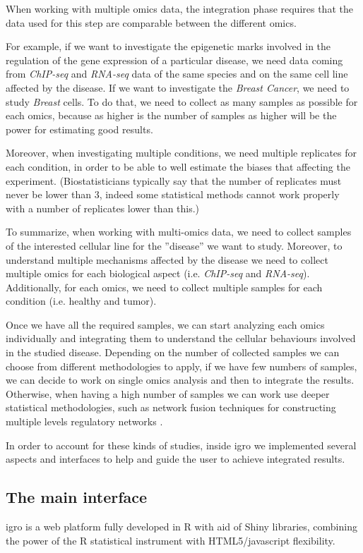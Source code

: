 When working with multiple omics data, the integration phase requires that the data used for this step are comparable between the different omics.

For example, if we want to investigate the epigenetic marks involved in the regulation of the gene expression of a particular disease, we need data coming from \textit{ChIP-seq} and \textit{RNA-seq} data of the same species and on the same cell line affected by the disease.
If we want to investigate the \textit{Breast Cancer}, we need to study \textit{Breast} cells.
To do that, we need to collect as many samples as possible for each omics, because as higher is the number of samples as higher will be the power for estimating good results.

Moreover, when investigating multiple conditions, we need multiple replicates for each condition, in order to be able to well estimate the biases that affecting the experiment.
(Biostatisticians typically say that the number of replicates must never be lower than 3, indeed some statistical methods cannot work properly with a number of replicates lower than this.)

To summarize, when working with multi-omics data, we need to collect samples of the interested cellular line for the ''disease'' we want to study.
Moreover, to understand multiple mechanisms affected by the disease we need to collect multiple omics for each biological aspect (i.e. \textit{ChIP-seq} and \textit{RNA-seq}).
Additionally, for each omics, we need to collect multiple samples for each condition (i.e. healthy and tumor).

Once we have all the required samples, we can start analyzing each omics individually and integrating them to understand the cellular behaviours involved in the studied disease.
Depending on the number of collected samples we can choose from different methodologies to apply, if we have few numbers of samples, we can decide to work on single omics analysis and then to integrate the results.
Otherwise, when having a high number of samples we can work use deeper statistical methodologies, such as network fusion techniques for constructing multiple levels regulatory networks \cite{Angelini2014c}.

In order to account for these kinds of studies, inside \gls{igro} we implemented several aspects and interfaces to help and guide the user to achieve integrated results.

\subsection{The main interface}
\gls{igro} is a web platform fully developed in R with aid of Shiny libraries, combining the power of the R statistical instrument with HTML5/javascript flexibility.

